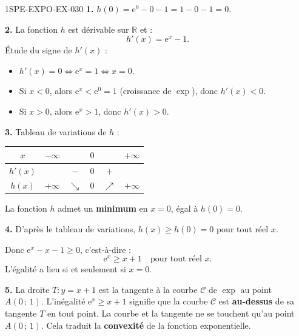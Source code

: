 \begin{corrige}{1SPE-EXPO-EX-030}
\textbf{1.} $h(0) = \mathrm{e}^0 - 0 - 1 = 1 - 0 - 1 = 0$.

\textbf{2.} La fonction $h$ est dérivable sur $\mathbb{R}$ et :
\[h'(x) = \mathrm{e}^x - 1.\]
Étude du signe de $h'(x)$ :
\begin{itemize}
  \item $h'(x) = 0 \iff \mathrm{e}^x = 1 \iff x = 0$.
  \item Si $x < 0$, alors $\mathrm{e}^x < \mathrm{e}^0 = 1$ (croissance de $\exp$), donc $h'(x) < 0$.
  \item Si $x > 0$, alors $\mathrm{e}^x > 1$, donc $h'(x) > 0$.
\end{itemize}

\textbf{3.} Tableau de variations de $h$ :

\begin{center}
\begin{tabular}{|c|ccccc|}
\hline
$x$ & $-\infty$ & & $0$ & & $+\infty$ \\
\hline
$h'(x)$ & & $-$ & $0$ & $+$ & \\
\hline
$h(x)$ & $+\infty$ & $\searrow$ & $0$ & $\nearrow$ & $+\infty$ \\
\hline
\end{tabular}
\end{center}

La fonction $h$ admet un \textbf{minimum} en $x = 0$, égal à $h(0) = 0$.

\textbf{4.} D'après le tableau de variations, $h(x) \geqslant h(0) = 0$ pour tout réel $x$.

Donc $\mathrm{e}^x - x - 1 \geqslant 0$, c'est-à-dire :
\[\boxed{\mathrm{e}^x \geqslant x + 1 \quad \text{pour tout réel } x.}\]
L'égalité a lieu si et seulement si $x = 0$.

\textbf{5.} La droite $T : y = x + 1$ est la tangente à la courbe $\mathcal{C}$ de $\exp$ au point $A(0\,;\,1)$. L'inégalité $\mathrm{e}^x \geqslant x + 1$ signifie que la courbe $\mathcal{C}$ est \textbf{au-dessus} de sa tangente $T$ en tout point. La courbe et la tangente ne se touchent qu'au point $A(0\,;\,1)$. Cela traduit la \textbf{convexité} de la fonction exponentielle.
\end{corrige}
